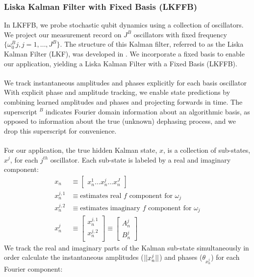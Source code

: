 \subsubsection{Liska Kalman Filter with Fixed Basis (LKFFB)}
In LKFFB, we probe stochastic qubit dynamics using a collection of oscillators.  We project our measurement record on $J^B$ oscillators with fixed frequency $\{ \omega_0^B j, j = 1, \hdots, J^B\}$. The structure of this Kalman filter, referred to as the Liska Kalman Filter (LKF), was developed in \cite{livska2007}. We incorporate a fixed basis to enable our application, yielding a Liska Kalman Filter with a Fixed Basis (LKFFB).
\\
\\
We track instantaneous amplitudes and phases explicitly for each basis oscillator With explicit phase and amplitude tracking, we enable state predictions by combining learned amplitudes and phases and projecting forwards in time. The superscript $ ^B$ indicates Fourier domain information about an algorithmic basis, as opposed to information about the true (unknown) dephasing process, and we drop this superscript for convenience.
\\
\\
For our application, the true hidden Kalman state, $x$, is a collection of sub-states, $x^j$, for each $j^{th}$ oscillator. Each sub-state is labeled by a real and imaginary component:
\begin{align}
x_n & \equiv \begin{bmatrix} x^{1}_{n} \hdots x^{j}_{n} \hdots x^{J}_{n} \end{bmatrix} \\
x^{j,1}_{n} & \equiv \text{estimates real $f$ component for $\omega_j$} \\
x^{j,2}_{n} & \equiv \text{estimates imaginary $f$ component for $\omega_j$} \\
x^j_n &\equiv \begin{bmatrix} x^{j,1}_{n} \\ x^{j,2}_{n} \\ \end{bmatrix} \equiv \begin{bmatrix} A^j_{n} \\ B^j_{n}  \end{bmatrix}
\end{align} 
We track the real and imaginary parts of the Kalman sub-state  simultaneously in order calculate the instantaneous amplitudes ($||x^j_n||$) and phases ($\theta_{x^j_n}$)  for each Fourier component:
